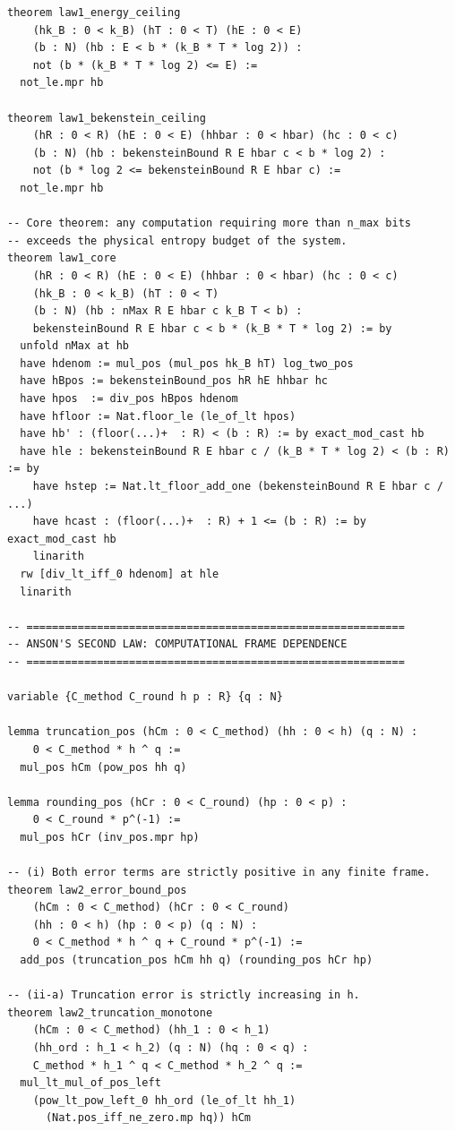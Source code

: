 \documentclass[12pt]{article}
\theoremstyle{lawstyle}
\theoremstyle{conjstyle}
\theoremstyle{predstyle}
\begin{document}
\begin{verbatim}
theorem law1_energy_ceiling
    (hk_B : 0 < k_B) (hT : 0 < T) (hE : 0 < E)
    (b : N) (hb : E < b * (k_B * T * log 2)) :
    not (b * (k_B * T * log 2) <= E) :=
  not_le.mpr hb

theorem law1_bekenstein_ceiling
    (hR : 0 < R) (hE : 0 < E) (hhbar : 0 < hbar) (hc : 0 < c)
    (b : N) (hb : bekensteinBound R E hbar c < b * log 2) :
    not (b * log 2 <= bekensteinBound R E hbar c) :=
  not_le.mpr hb

-- Core theorem: any computation requiring more than n_max bits
-- exceeds the physical entropy budget of the system.
theorem law1_core
    (hR : 0 < R) (hE : 0 < E) (hhbar : 0 < hbar) (hc : 0 < c)
    (hk_B : 0 < k_B) (hT : 0 < T)
    (b : N) (hb : nMax R E hbar c k_B T < b) :
    bekensteinBound R E hbar c < b * (k_B * T * log 2) := by
  unfold nMax at hb
  have hdenom := mul_pos (mul_pos hk_B hT) log_two_pos
  have hBpos := bekensteinBound_pos hR hE hhbar hc
  have hpos  := div_pos hBpos hdenom
  have hfloor := Nat.floor_le (le_of_lt hpos)
  have hb' : (floor(...)+  : R) < (b : R) := by exact_mod_cast hb
  have hle : bekensteinBound R E hbar c / (k_B * T * log 2) < (b : R) := by
    have hstep := Nat.lt_floor_add_one (bekensteinBound R E hbar c / ...)
    have hcast : (floor(...)+  : R) + 1 <= (b : R) := by exact_mod_cast hb
    linarith
  rw [div_lt_iff_0 hdenom] at hle
  linarith

-- ===========================================================
-- ANSON'S SECOND LAW: COMPUTATIONAL FRAME DEPENDENCE
-- ===========================================================

variable {C_method C_round h p : R} {q : N}

lemma truncation_pos (hCm : 0 < C_method) (hh : 0 < h) (q : N) :
    0 < C_method * h ^ q :=
  mul_pos hCm (pow_pos hh q)

lemma rounding_pos (hCr : 0 < C_round) (hp : 0 < p) :
    0 < C_round * p^(-1) :=
  mul_pos hCr (inv_pos.mpr hp)

-- (i) Both error terms are strictly positive in any finite frame.
theorem law2_error_bound_pos
    (hCm : 0 < C_method) (hCr : 0 < C_round)
    (hh : 0 < h) (hp : 0 < p) (q : N) :
    0 < C_method * h ^ q + C_round * p^(-1) :=
  add_pos (truncation_pos hCm hh q) (rounding_pos hCr hp)

-- (ii-a) Truncation error is strictly increasing in h.
theorem law2_truncation_monotone
    (hCm : 0 < C_method) (hh_1 : 0 < h_1)
    (hh_ord : h_1 < h_2) (q : N) (hq : 0 < q) :
    C_method * h_1 ^ q < C_method * h_2 ^ q :=
  mul_lt_mul_of_pos_left
    (pow_lt_pow_left_0 hh_ord (le_of_lt hh_1)
      (Nat.pos_iff_ne_zero.mp hq)) hCm


\end{verbatim}
\end{document}
